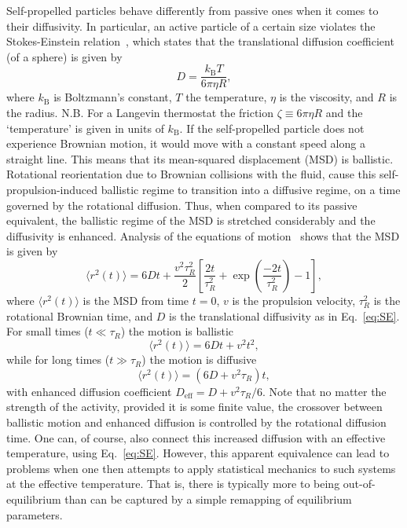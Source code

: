 \documentclass[aip,jcp,reprint,a4paper,onecolumn,amsmath]{revtex4-1}
\begin{document}
Self-propelled particles behave differently from passive ones when it comes to
their diffusivity. In particular, an active particle of a certain size violates
the Stokes-Einstein relation~\cite{einstein06}, which states that the
translational diffusion coefficient (of a sphere) is given by
\begin{equation}
\label{eq:SE} D = \frac{k_{\mathrm{B}}T}{6 \pi \eta R},
\end{equation}
where $k_{\mathrm{B}}$ is Boltzmann's constant, $T$ the temperature, $\eta$ is
the viscosity, and $R$ is the radius. N.B. For a Langevin thermostat the
friction $\zeta \equiv 6 \pi \eta R$ and the `temperature' is given in units of
$k_{\mathrm{B}}$. If the self-propelled particle does not experience Brownian
motion, it would move with a constant speed along a straight line. This means
that its mean-squared displacement (MSD) is ballistic. Rotational reorientation
due to Brownian collisions with the fluid, cause this self-propulsion-induced
ballistic regime to transition into a diffusive regime, on a time governed by
the rotational diffusion. Thus, when compared to its passive equivalent, the
ballistic regime of the MSD is stretched considerably and the diffusivity is
enhanced. Analysis of the equations of motion~\cite{Howse_07} shows that the
MSD is given by
\begin{equation}
\label{eq:emsd} \langle r^{2}(t) \rangle = 6 D t + \frac{v^{2} \tau^{2}_{R}}{2} \left[ \frac{2 t}{\tau^{2}_{R}} + \exp\left( \frac{-2t}{\tau^{2}_{R}} \right) - 1 \right],
\end{equation}
where $\langle r^{2}(t) \rangle$ is the MSD from time $t=0$, $v$ is the
propulsion velocity, $\tau^{2}_{R}$ is the rotational Brownian time, and $D$ is
the translational diffusivity as in Eq.~\eqref{eq:SE}. For small times ($t \ll
\tau_{R}$) the motion is ballistic
\begin{equation}
\label{eq:bal} \langle r^{2}(t) \rangle = 6 D t + v^{2} t^{2},
\end{equation}
while for long times ($t \gg \tau_{R}$) the motion is diffusive
\begin{equation}
\label{eq:diff} \langle r^{2}(t) \rangle = (6 D + v^{2}\tau_{R}) t,
\end{equation}
with enhanced diffusion coefficient $D_{\mathrm{eff}} = D + v^{2}\tau_{R}/6$.
Note that no matter the strength of the activity, provided it is some finite
value, the crossover between ballistic motion and enhanced diffusion is
controlled by the rotational diffusion time. One can, of course, also connect
this increased diffusion with an effective temperature, using
Eq.~\eqref{eq:SE}. However, this apparent equivalence can lead to problems when
one then attempts to apply statistical mechanics to such systems at the
effective temperature. That is, there is typically more to being
out-of-equilibrium than can be captured by a simple remapping of equilibrium
parameters.
\end{document}
